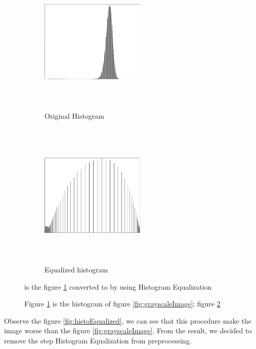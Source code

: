 \begin{figure}[h]
\centering
    \begin{subfigure}{0.4\textwidth}
        \centering
        \includegraphics[width=5cm,height=7cm]{Images/Preprocessing/grayhisto.png}
        \caption{Original Histogram}
        \label{fig:origin_histogram}
    \end{subfigure}
    \begin{subfigure}{0.4\textwidth}
        \centering
        \includegraphics[width=5cm,height=7cm]{Images/Preprocessing/equalhisto.png}
        \caption{Equalized histogram}
        \label{fig:Equalizedhistogram}
    \end{subfigure}
    \caption{Figure \ref{fig:origin_histogram} is the histogram of figure \ref{fig:grayscaleImage}; figure \ref{fig:Equalizedhistogram} } is the figure \ref{fig:origin_histogram} converted to by using Histogram Equalization
    \label{fig:histogram_equalization}
\end{figure}

Observe the figure \ref{fig:histoEqualized}, we can see that this procedure make the image worse than the figure \ref{fig:grayscaleImage}. From the result, we decided to remove the step Histogram Equalization from preprocessing.

